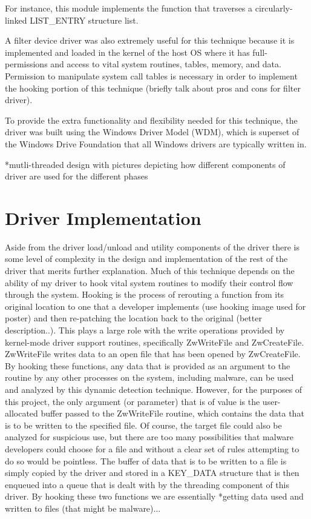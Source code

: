 \documentclass[times, 10pt,twocolumn]{article}
\begin{document}
For instance, this module implements the function that traverses a circularly-linked LIST\_ENTRY structure list. 

A filter device driver was also extremely useful for this technique because it is implemented and loaded in the kernel of the host OS where it has full-permissions and access to vital system routines, tables, memory, and data. Permission to manipulate system call tables is necessary in order to implement the hooking portion of this technique (briefly talk about pros and cons for filter driver). 

To provide the extra functionality and flexibility needed for this technique, the driver was built using the Windows Driver Model (WDM), which is superset of the Windows Drive Foundation that all Windows drivers are typically written in.

*mutli-threaded design with pictures depicting how different components of driver are used for the different phases

\section{Driver Implementation}
\label{Implementation}

Aside from the driver load/unload and utility components of the driver there is some level of complexity in the design and implementation of the rest of the driver that merits further explanation. Much of this technique depends on the ability of my driver to hook vital system routines to modify their control flow through the system. Hooking is the process of rerouting a function from its original location to one that a developer implements (use hooking image used for poster) and then re-patching the location back to the original (better description..). This plays a large role with the write operations provided by kernel-mode driver support routines, specifically ZwWriteFile and ZwCreateFile. ZwWriteFile writes data to an open file that has been opened by ZwCreateFile. By hooking these functions, any data that is provided as an argument to the routine by any other processes on the system, including malware, can be used and analyzed by this dynamic detection technique. However, for the purposes of this project, the only argument (or parameter) that is of value is the user-allocated buffer passed to the ZwWriteFile routine, which contains the data that is to be written to the specified file. Of course, the target file could also be analyzed for suspicious use, but there are too many possibilities that malware developers could choose for a file and without a clear set of rules attempting to do so would be pointless. The buffer of data that is to be written to a file is simply copied by the driver and stored in a KEY\_DATA structure that is then enqueued into a queue that is dealt with by the threading component of this driver. By hooking these two functions we are essentially *getting data used and written to files (that might be malware)...
\end{document}

